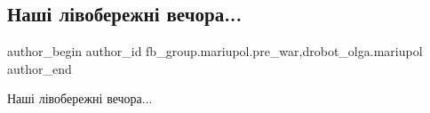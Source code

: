  
 
 
 
 

\subsection{Наші лівобережні  вечора...}
\label{sec:09_02_2023.fb.fb_group.mariupol.pre_war.7.nash__l_voberezhn___}
 
\ifcmt
 author_begin
   author_id fb_group.mariupol.pre_war,drobot_olga.mariupol
 author_end
\fi

Наші лівобережні вечора...
